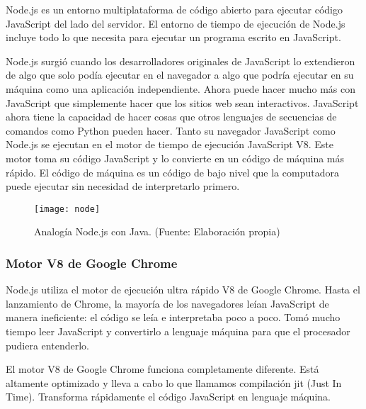 Node.js es un entorno multiplataforma de código abierto para ejecutar código JavaScript del lado del servidor. El entorno de tiempo de ejecución de Node.js incluye todo lo que necesita para ejecutar un programa escrito en JavaScript. 
\vspace{0.8cm}

Node.js surgió cuando los desarrolladores originales de JavaScript lo extendieron de algo que solo podía ejecutar en el navegador a algo que podría ejecutar en su máquina como una aplicación independiente. Ahora puede hacer mucho más con JavaScript que simplemente hacer que los sitios web sean interactivos. JavaScript ahora tiene la capacidad de hacer cosas que otros lenguajes de secuencias de comandos como Python pueden hacer. Tanto su navegador JavaScript como Node.js se ejecutan en el motor de tiempo de ejecución JavaScript V8. Este motor toma su código JavaScript y lo convierte en un código de máquina más rápido. El código de máquina es un código de bajo nivel que la computadora puede ejecutar sin necesidad de interpretarlo primero.
\vspace{0.8cm}

\begin{figure}[H]
  \centering
  \texttt{[image: node]}
  \caption{Analogía Node.js con Java. (Fuente: Elaboración propia)}
\end{figure}

\subsubsection{Motor V8 de Google Chrome}
Node.js utiliza el motor de ejecución ultra rápido V8 de Google Chrome. Hasta el lanzamiento de Chrome, la mayoría de los navegadores leían JavaScript de manera ineficiente: el código se leía e interpretaba poco a poco. Tomó mucho tiempo leer JavaScript y convertirlo a lenguaje máquina para que el procesador pudiera entenderlo. 
\vspace{0.8cm}

El motor V8 de Google Chrome funciona completamente diferente. Está altamente optimizado y lleva a cabo lo que llamamos compilación \acrshort{jit} (Just In Time). Transforma rápidamente el código JavaScript en lenguaje máquina.
\vspace{0.8cm}


